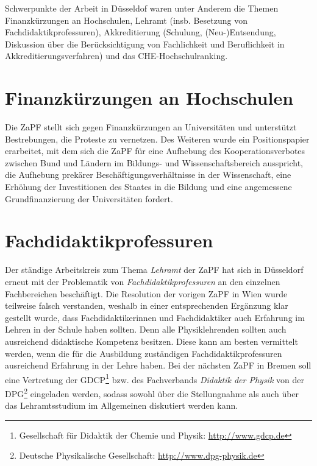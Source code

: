 \documentclass{scrartcl}
\renewcommand{\headrulewidth}{0pt}
\begin{document}
Schwerpunkte der Arbeit in D\"usseldof waren unter Anderem die Themen Finanzk\"urzungen an Hochschulen, Lehramt (insb. Besetzung von Fachdidaktikprofessuren), Akkreditierung (Schulung, (Neu-)Entsendung, Diskussion über die Ber\"ucksichtigung von Fachlichkeit und Beruflichkeit in Akkreditierungsverfahren) und das CHE-Hochschulranking.
\pagebreak

\renewcommand{\headrulewidth}{0.1pt}
\rhead{\thepage}
\section*{Finanzk\"urzungen an Hochschulen}
Die  ZaPF stellt sich gegen Finanzk\"urzungen an Universit\"aten und unterst\"utzt  Bestrebungen, die Proteste zu vernetzen. Des Weiteren wurde ein Positionspapier erarbeitet, mit dem sich die ZaPF f\"ur eine Aufhebung des  Kooperationsverbotes zwischen Bund und L\"andern im Bildungs- und  Wissenschaftsbereich ausspricht, die Aufhebung prek\"arer  Besch\"aftigungsverh\"altnisse in der Wissenschaft, eine Erh\"ohung der Investitionen des Staates in die Bildung und eine angemessene Grundfinanzierung der Universit\"aten fordert.

\section*{Fachdidaktikprofessuren}
Der  st\"andige  Arbeitskreis zum Thema \emph{Lehramt} der ZaPF hat sich in  D\"usseldorf erneut mit der  Problematik von  \emph{Fachdidaktikprofessuren} an den einzelnen  Fachbereichen  besch\"aftigt. Die Resolution der vorigen ZaPF in Wien wurde teilweise  falsch verstanden, weshalb in einer entsprechenden Erg\"anzung klar gestellt wurde, dass Fachdidaktikerinnen und Fachdidaktiker auch Erfahrung im Lehren in der Schule haben sollten. Denn alle Physiklehrenden sollten auch ausreichend didaktische Kompetenz besitzen. Diese kann am besten vermittelt werden, wenn die für die Ausbildung zust\"andigen Fachdidaktikprofessuren ausreichend Erfahrung in der Lehre haben.
Bei der n\"achsten ZaPF in Bremen soll eine Vertretung der GDCP\footnote{Gesellschaft f\"ur Didaktik der Chemie und Physik: \href{http://www.gdcp.de}{\url{http://www.gdcp.de}}}  bzw. des Fachverbands \emph{Didaktik der Physik} von der DPG\footnote{Deutsche Physikalische Gesellschaft: \href{http://www.dpg-physik.de}{\url{http://www.dpg-physik.de}}} eingeladen werden, sodass sowohl \"uber die Stellungnahme als auch \"uber das Lehramtsstudium im Allgemeinen diskutiert werden kann.
\end{document}
